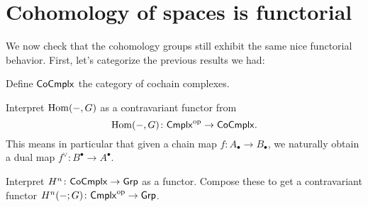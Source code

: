 \section{Cohomology of spaces is functorial}
We now check that the cohomology groups still exhibit the same nice functorial behavior.
First, let's categorize the previous results we had:

\begin{ques}
	Define $\mathsf{CoCmplx}$
	the category of cochain complexes.
\end{ques}

\begin{exercise}
	Interpret $\operatorname{Hom}(-,G)$ as a contravariant functor
	from \[ \operatorname{Hom}(-,G) \colon \mathsf{Cmplx}^{\mathrm{op}} \to \mathsf{CoCmplx}. \]
	This means in particular that given a chain map $f \colon A_\bullet \to B_\bullet$,
	we naturally obtain a dual map $f^\vee \colon B^\bullet \to A^\bullet$.
\end{exercise}

\begin{ques}
	Interpret $H^n \colon \mathsf{CoCmplx} \to \mathsf{Grp}$ as a functor.
	Compose these to get a contravariant functor
	$H^n(-;G) \colon \mathsf{Cmplx}^{\mathrm{op}} \to \mathsf{Grp}$.
\end{ques}

